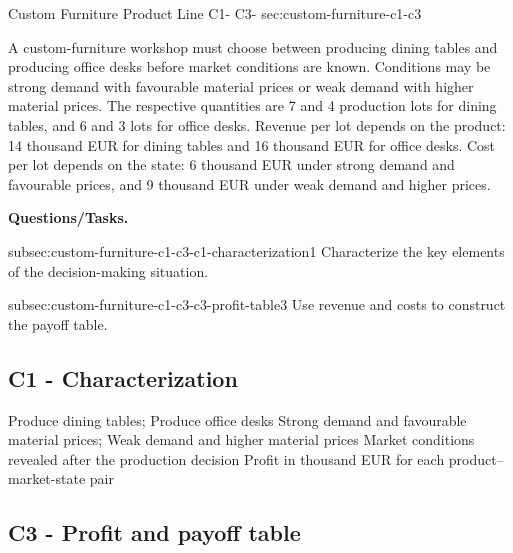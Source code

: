 	
	\sectionScored
	{Custom Furniture Product Line}
	{C1- \hspace{2mm} C3-}
	{sec:custom-furniture-c1-c3}
	{
	A custom-furniture workshop must choose between producing dining tables
	and producing office desks before market conditions are known. Conditions
	may be strong demand with favourable material prices or weak demand with
	higher material prices. The respective quantities are 7 and 4 production
	lots for dining tables, and 6 and 3 lots for office desks. Revenue per lot
	depends on the product: 14 thousand EUR for dining tables and 16 thousand
	EUR for office desks. Cost per lot depends on the state: 6 thousand EUR
	under strong demand and favourable prices, and 9 thousand EUR under weak
	demand and higher prices.
	
	\textbf{Questions/Tasks.}
	\begin{enumerate}
		\CriterionTask
		{subsec:custom-furniture-c1-c3-c1-characterization}{1}
		{Characterize the key elements of the decision-making situation. }
		
		\CriterionTask
		{subsec:custom-furniture-c1-c3-c3-profit-table}{3}
		{Use revenue and costs to construct the payoff table. }
	\end{enumerate}
	
	\label{subsec:custom-furniture-c1-c3-c1-characterization}
	\subsection*{C1 - Characterization }
	
	\DecisionElementsTable
	{Produce dining tables; Produce office desks}
	{Strong demand and favourable material prices; Weak demand and higher material prices}
	{Market conditions revealed after the production decision}
	{Profit in thousand EUR for each product--market-state pair}
	
	\label{subsec:custom-furniture-c1-c3-c3-profit-table}
	\subsection*{C3 - Profit and payoff table }
	
	
}
